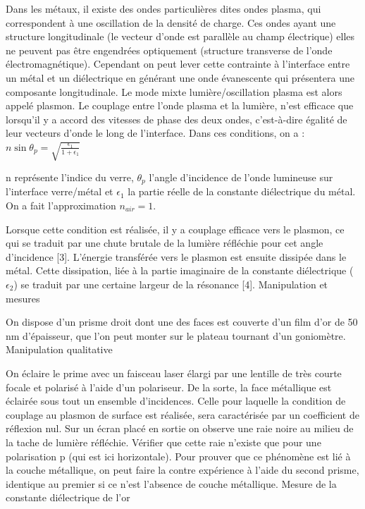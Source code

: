 \documentclass{article}%
\begin{document}
Dans les métaux, il existe des ondes particulières dites ondes plasma, qui correspondent à une oscillation de la densité de charge. Ces ondes ayant une structure longitudinale (le vecteur d'onde est parallèle au champ électrique) elles ne peuvent pas être engendrées optiquement (structure transverse de l'onde électromagnétique). Cependant on peut lever cette contrainte à l'interface entre un métal et un diélectrique en générant une onde évanescente qui présentera une composante longitudinale. Le mode mixte lumière/oscillation plasma est alors appelé plasmon. Le couplage entre l'onde plasma et la lumière, n'est efficace que lorsqu'il y a accord des vitesses de phase des deux ondes, c'est-à-dire égalité de leur vecteurs d'onde le long de l'interface. Dans ces conditions, on a :
$n \sin \theta_p = \sqrt{\frac{\epsilon_1}{1+\epsilon_1}}$

n représente l'indice du verre, $\theta_p$ l'angle d'incidence de l'onde lumineuse sur l'interface verre/métal et $\epsilon_1$ la partie réelle de la constante diélectrique du métal. On a fait l'approximation $n_{air}=1$.

Lorsque cette condition est réalisée, il y a couplage efficace vers le plasmon, ce qui se traduit par une chute brutale de la lumière réfléchie pour cet angle d'incidence [3]. L'énergie transférée vers le plasmon est ensuite dissipée dans le métal. Cette dissipation, liée à la partie imaginaire de la constante diélectrique ($\epsilon_2$) se traduit par une certaine largeur de la résonance [4].
Manipulation et mesures

On dispose d'un prisme droit dont une des faces est couverte d'un film d'or de 50 nm d'épaisseur, que l'on peut monter sur le plateau tournant d'un goniomètre.
Manipulation qualitative

On éclaire le prime avec un faisceau laser élargi par une lentille de très courte focale et polarisé à l'aide d'un polariseur. De la sorte, la face métallique est éclairée sous tout un ensemble d'incidences. Celle pour laquelle la condition de couplage au plasmon de surface est réalisée, sera caractérisée par un coefficient de réflexion nul. Sur un écran placé en sortie on observe une raie noire au milieu de la tache de lumière réfléchie. Vérifier que cette raie n'existe que pour une polarisation p (qui est ici horizontale). Pour prouver que ce phénomène est lié à la couche métallique, on peut faire la contre expérience à l'aide du second prisme, identique au premier si ce n'est l'absence de couche métallique.
Mesure de la constante diélectrique de l'or
\end{document}
